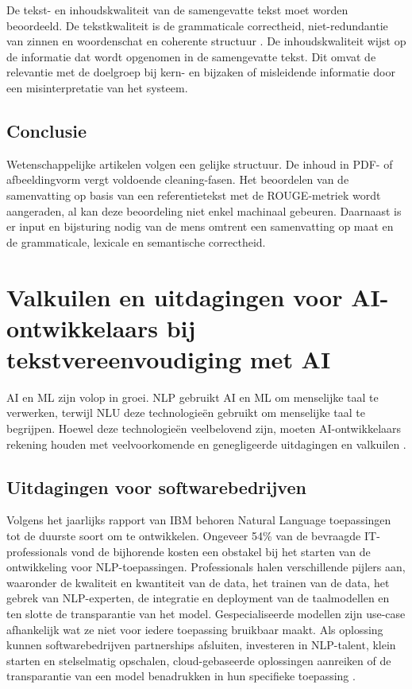 De tekst- en inhoudskwaliteit van de samengevatte tekst moet worden beoordeeld. De tekstkwaliteit is de grammaticale correctheid, niet-redundantie van zinnen en woordenschat en coherente structuur \autocite{McCombes2022}. De inhoudskwaliteit wijst op de informatie dat wordt opgenomen in de samengevatte tekst. Dit omvat de relevantie met de doelgroep bij kern- en bijzaken of misleidende informatie door een misinterpretatie van het systeem.


\subsection{Conclusie}

Wetenschappelijke artikelen volgen een gelijke structuur. De inhoud in PDF- of afbeeldingvorm vergt voldoende cleaning-fasen. Het beoordelen van de samenvatting op basis van een referentietekst met de ROUGE-metriek wordt aangeraden, al kan deze beoordeling niet enkel machinaal gebeuren. Daarnaast is er input en bijsturing nodig van de mens omtrent een samenvatting op maat en de grammaticale, lexicale en semantische correctheid.


\section{Valkuilen en uitdagingen voor AI-ontwikkelaars bij tekstvereenvoudiging met AI}

AI en ML zijn volop in groei. NLP gebruikt AI en ML om menselijke taal te verwerken, terwijl NLU deze technologieën gebruikt om menselijke taal te begrijpen. Hoewel deze technologieën veelbelovend zijn, moeten AI-ontwikkelaars rekening houden met veelvoorkomende en genegligeerde uitdagingen en valkuilen \autocite{Sciforce2020, Roldos2020, Khurana2022}.

\subsection{Uitdagingen voor softwarebedrijven}

Volgens het jaarlijks rapport van IBM behoren Natural Language toepassingen tot de duurste soort om te ontwikkelen. Ongeveer 54\% van de bevraagde IT-professionals vond de bijhorende kosten een obstakel bij het starten van de ontwikkeling voor NLP-toepassingen. Professionals halen verschillende pijlers aan, waaronder de kwaliteit en kwantiteit van de data, het trainen van de data, het gebrek van NLP-experten, de integratie en deployment van de taalmodellen en ten slotte de transparantie van het model. Gespecialiseerde modellen zijn use-case afhankelijk wat ze niet voor iedere toepassing bruikbaar maakt. Als oplossing kunnen softwarebedrijven partnerships afsluiten, investeren in NLP-talent, klein starten en stelselmatig opschalen, cloud-gebaseerde oplossingen aanreiken of de transparantie van een model benadrukken in hun specifieke toepassing \autocite{IBM2022}.

